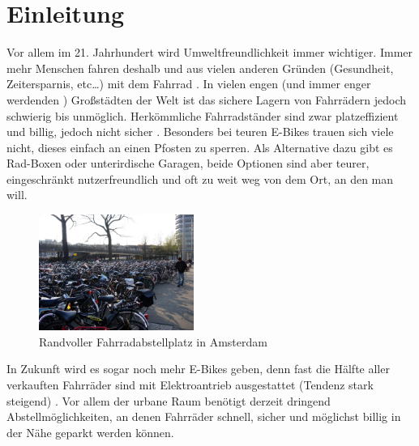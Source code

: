 \section{Einleitung}
Vor allem im 21. Jahrhundert wird Umweltfreundlichkeit immer wichtiger. Immer mehr Menschen fahren deshalb und aus vielen anderen Gründen (Gesundheit, Zeitersparnis, etc…) mit dem Fahrrad . In vielen engen (und immer enger werdenden ) Großstädten der Welt ist das sichere Lagern von Fahrrädern jedoch schwierig bis unmöglich. Herkömmliche Fahrradständer sind zwar platzeffizient und billig, jedoch nicht sicher . Besonders bei teuren E-Bikes trauen sich viele nicht, dieses einfach an einen Pfosten zu sperren. Als Alternative dazu gibt es Rad-Boxen oder unterirdische Garagen, beide Optionen sind aber teurer, eingeschränkt nutzerfreundlich und oft zu weit weg von dem Ort, an den man will.

\begin{figure}[H]
    \centering
    \includegraphics[width=0.45\textwidth]{images/fahrrad_parkhaus_voll}
    \caption{Randvoller Fahrradabstellplatz in Amsterdam }
    \label{fig:fahrrad_parkhaus_voll}
\end{figure}

\noindent In Zukunft wird es sogar noch mehr E-Bikes geben, denn fast die Hälfte aller verkauften Fahrräder sind mit Elektroantrieb ausgestattet (Tendenz stark steigend) . Vor allem der urbane Raum benötigt derzeit dringend Abstellmöglichkeiten, an denen Fahrräder schnell, sicher und möglichst billig in der Nähe geparkt werden können.

\clearpage


\clearpage



